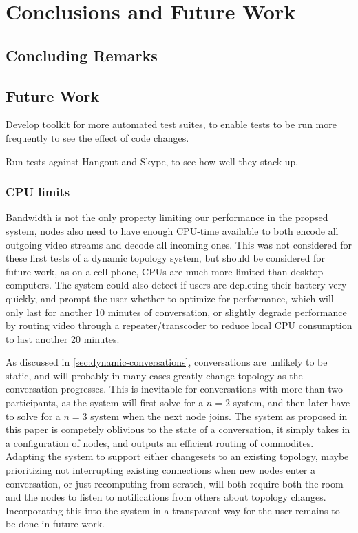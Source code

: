 \chapter{Conclusions and Future Work}\label{chp:conclusions}


\section{Concluding Remarks}\label{sec:conclusions}



\section{Future Work}\label{sec:future_work}

Develop toolkit for more automated test suites, to enable tests to be run more frequently to see the effect of code changes.

Run tests against Hangout and Skype, to see how well they stack up.

\subsection{CPU limits}

Bandwidth is not the only property limiting our performance in the propsed system, nodes also need to have enough CPU-time available to both encode all outgoing video streams and decode all incoming ones. This was not considered for these first tests of a dynamic topology system, but should be considered for future work, as on a cell phone, CPUs are much more limited than desktop computers. The system could also detect if users are depleting their battery very quickly, and prompt the user whether to optimize for performance, which will only last for another 10 minutes of conversation, or slightly degrade performance by routing video through a repeater/transcoder to reduce local CPU consumption to last another 20 minutes.

As discussed in \autoref{sec:dynamic-conversations}, conversations are unlikely to be static, and will probably in many cases greatly change topology as the conversation progresses. This is inevitable for conversations with more than two participants, as the system will first solve for a $n=2$ system, and then later have to solve for a $n=3$ system when the next node joins. The system as proposed in this paper is competely oblivious to the state of a conversation, it simply takes in a configuration of nodes, and outputs an efficient routing of commodites. Adapting the system to support either changesets to an existing topology, maybe prioritizing not interrupting existing connections when new nodes enter a conversation, or just recomputing from scratch, will both require both the room and the nodes to listen to notifications from others about topology changes. Incorporating this into the system in a transparent way for the user remains to be done in future work.


